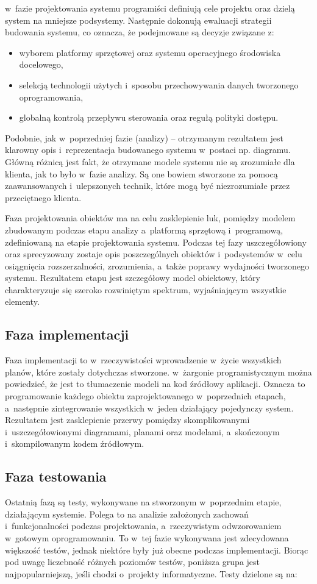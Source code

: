 \documentclass[oneside,polski,logo]{amuthesis}
\begin{document}
w~fazie projektowania systemu programiści definiują cele projektu oraz dzielą system na mniejsze podsystemy. Następnie dokonują ewaluacji strategii budowania systemu, co oznacza, że podejmowane są decyzje związane z:

\begin{itemize}
	\item  wyborem platformy sprzętowej oraz systemu operacyjnego środowiska docelowego,
	\item  selekcją technologii użytych i~sposobu przechowywania danych tworzonego oprogramowania,
	\item  globalną kontrolą przepływu sterowania oraz regułą polityki dostępu.
\end{itemize}

Podobnie, jak w~poprzedniej fazie (analizy) – otrzymanym rezultatem jest klarowny opis i~reprezentacja budowanego systemu w~postaci np. diagramu. Główną różnicą jest fakt, że otrzymane modele systemu nie są zrozumiałe dla klienta, jak to było w~fazie analizy. Są one bowiem stworzone za pomocą zaawansowanych i~ulepszonych technik, które mogą być niezrozumiałe przez przeciętnego klienta.

Faza projektowania obiektów ma na celu zasklepienie luk, pomiędzy modelem zbudowanym podczas etapu analizy a~platformą sprzętową i~programową, zdefiniowaną na etapie projektowania systemu. Podczas tej fazy uszczegółowiony oraz sprecyzowany zostaje opis poszczególnych obiektów i~podsystemów w~celu osiągnięcia rozszerzalności, zrozumienia, a~także poprawy wydajności tworzonego systemu. Rezultatem etapu jest szczegółowy model obiektowy, który charakteryzuje się szeroko rozwiniętym spektrum, wyjaśniającym wszystkie elementy.

\subsection {Faza implementacji}
Faza implementacji to w~rzeczywistości wprowadzenie w~życie wszystkich planów, które zostały dotychczas stworzone. w~żargonie programistycznym można powiedzieć, że jest to tłumaczenie modeli na kod źródłowy aplikacji. Oznacza to programowanie każdego obiektu zaprojektowanego w~poprzednich etapach, a~następnie zintegrowanie wszystkich w~jeden działający pojedynczy system. Rezultatem jest zasklepienie przerwy pomiędzy skomplikowanymi i~uszczegółowionymi diagramami, planami oraz modelami, a~skończonym i~skompilowanym kodem źródłowym.

\subsection {Faza testowania}
Ostatnią fazą są testy, wykonywane na stworzonym w~poprzednim etapie, działającym systemie. Polega to na analizie założonych zachowań i~funkcjonalności podczas projektowania, a~rzeczywistym odwzorowaniem w~gotowym oprogramowaniu. To w~tej fazie wykonywana jest zdecydowana większość testów, jednak niektóre były już obecne podczas implementacji. Biorąc pod uwagę liczebność różnych poziomów testów, poniższa grupa jest najpopularniejszą, jeśli chodzi o~projekty informatyczne. Testy dzielone są na:
\end{document}
